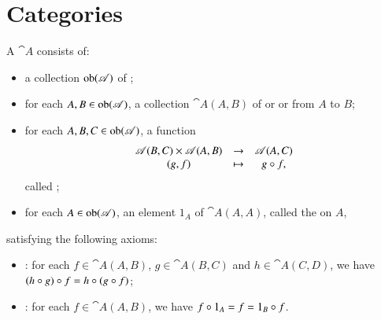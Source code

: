 \section{Categories}
\label{sec:cats}


\begin{defn}
A %
%
%
$\cat{A}$ consists of:
% 
\begin{itemize}
\item 
a collection $\operatorname{ob}(\mathscr{A})$%
%
%
of ;%
%
%

\item 
for each $A, B \in \operatorname{ob}(\mathscr{A})$, a collection $\cat{A}(A, B)$%
%
%
of %
%
%
or %
%
%
or %
%
% 
from $A$ to $B$;

\item 
for each $A, B, C \in \operatorname{ob}(\mathscr{A})$, a function
\[
\begin{array}{ccc}
\cat{A}(B, C) \times \cat{A}(A, B) &
\to	&
\cat{A}(A, C)	\\
(g, f)	&
\mapsto	&
g \of f,%
%
\ntn{of}
%
\end{array}
\]
called ;%
%
%

\item 
for each $A \in \operatorname{ob}(\mathscr{A})$, an element $1_A$%
%
%
of $\cat{A}(A, A)$, called the %
%
%
on $A$,
\end{itemize}
% 
satisfying the following axioms:
% 
\begin{itemize}
\item 
{}:%
%
%
for each $f \in \cat{A}(A, B)$, $g \in \cat{A}(B, C)$ and $h \in \cat{A}(C,
D)$, we have $(h \mathbin{\circ} g) \mathbin{\circ} f = h \mathbin{\circ} (g \mathbin{\circ} f)$;

\item 
{}: for each $f \in \cat{A}(A, B)$, we have $f \mathbin{\circ} 1_A = f = 1_B \mathbin{\circ} f$.
\end{itemize}
\end{defn}

